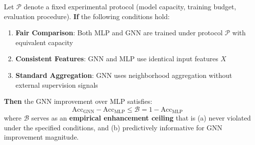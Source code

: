 \begin{theorem}
\label{thm:conditional_bound}
Let $\mathcal{P}$ denote a fixed experimental protocol (model capacity, training budget, evaluation procedure). \textbf{If} the following conditions hold:
\begin{enumerate}
    \item[(C1)] \textbf{Fair Comparison}: Both MLP and GNN are trained under protocol $\mathcal{P}$ with equivalent capacity
    \item[(C2)] \textbf{Consistent Features}: GNN and MLP use identical input features $X$
    \item[(C3)] \textbf{Standard Aggregation}: GNN uses neighborhood aggregation without external supervision signals
\end{enumerate}
\textbf{Then} the GNN improvement over MLP satisfies:
\begin{equation}
    \text{Acc}_{\text{GNN}} - \text{Acc}_{\text{MLP}} \leq \mathcal{B} = 1 - \text{Acc}_{\text{MLP}}
\end{equation}
where $\mathcal{B}$ serves as an \textbf{empirical enhancement ceiling} that is (a) never violated under the specified conditions, and (b) predictively informative for GNN improvement magnitude.
\end{theorem}

